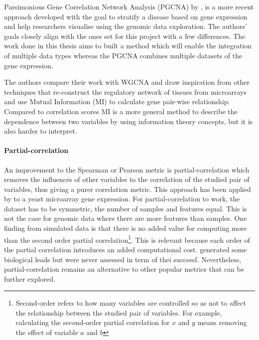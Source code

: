Parsimonious Gene Correlation Network Analysis (PGCNA) by \citet{Care2019-ij}, is a more recent approach developed with the goal to stratify a disease based on gene expression and help researchers visualise using the genomic data exploration. The authors' goals closely align with the ones set for this project with a few differences. The work done in this thesis aims to built a method which will enable the integration of multiple data types whereas the PGCNA combines multiple datasets of the gene expression. 

The authors compare their work with WGCNA and draw inspiration from other techniques that re-construct the regulatory network of tissues from microarrays and use Mutual Information (MI) \citet{Margolin2006-mc,Zhang2013-fs} to calculate gene pair-wise relationship. Compared to correlation scores MI is a more general method to describe the dependence between two variables by using information theory concepts, but it is also harder to interpret.


\paragraph*{Partial-correlation} \label{s:lit:partial-corr}

An improvement to the Spearman or Pearson metric is partial-correlation which removes the influences of other variables to the correlation of the studied pair of variables, thus giving a purer correlation metric. This approach has been applied by \citet{De_la_Fuente2004-ts} to a yeast microarray gene expression.  For partial-correlation to work, the dataset has to be symmetric, the number of samples and features equal. This is not the case for genomic data where there are more features than samples. One finding from simulated data is that there is no added value for computing more than the second order partial correlation\footnote{Second-order refers to how many variables are controlled so as not to affect the relationship between the studied pair of variables. For example, calculating the second-order partial correlation for $x$ and $y$ means removing the effect of variable $a$ and $b$}. This is relevant because each order of the partial correlation introduces an added computational cost. \citet{De_la_Fuente2004-ts} generated some biological leads but were never assessed in term of thei successf. Nevertheless, partial-correlation remains an alternative to other popular metrics that can be further explored.

